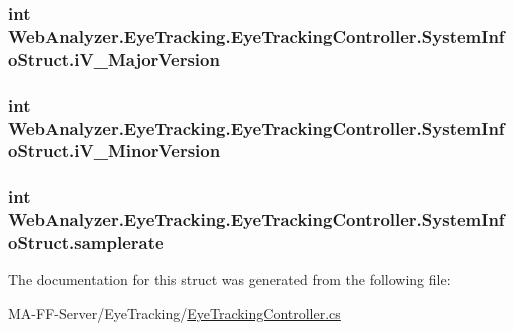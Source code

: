 \subsubsection[{i\+V\+\_\+\+Major\+Version}]{\setlength{\rightskip}{0pt plus 5cm}int Web\+Analyzer.\+Eye\+Tracking.\+Eye\+Tracking\+Controller.\+System\+Info\+Struct.\+i\+V\+\_\+\+Major\+Version}\label{struct_web_analyzer_1_1_eye_tracking_1_1_eye_tracking_controller_1_1_system_info_struct_ab64555809b3f5e516a6248565ee79ac7}
\hypertarget{struct_web_analyzer_1_1_eye_tracking_1_1_eye_tracking_controller_1_1_system_info_struct_ab19d06d21510b7f2bc3c3bd181abe574}{}
\subsubsection[{i\+V\+\_\+\+Minor\+Version}]{\setlength{\rightskip}{0pt plus 5cm}int Web\+Analyzer.\+Eye\+Tracking.\+Eye\+Tracking\+Controller.\+System\+Info\+Struct.\+i\+V\+\_\+\+Minor\+Version}\label{struct_web_analyzer_1_1_eye_tracking_1_1_eye_tracking_controller_1_1_system_info_struct_ab19d06d21510b7f2bc3c3bd181abe574}
\hypertarget{struct_web_analyzer_1_1_eye_tracking_1_1_eye_tracking_controller_1_1_system_info_struct_ad01eaf2951431e56461a816f587d5957}{}
\subsubsection[{samplerate}]{\setlength{\rightskip}{0pt plus 5cm}int Web\+Analyzer.\+Eye\+Tracking.\+Eye\+Tracking\+Controller.\+System\+Info\+Struct.\+samplerate}\label{struct_web_analyzer_1_1_eye_tracking_1_1_eye_tracking_controller_1_1_system_info_struct_ad01eaf2951431e56461a816f587d5957}


The documentation for this struct was generated from the following file\+:\begin{DoxyCompactItemize}
\item 
M\+A-\/\+F\+F-\/\+Server/\+Eye\+Tracking/\hyperlink{_eye_tracking_controller_8cs}{Eye\+Tracking\+Controller.\+cs}\end{DoxyCompactItemize}
